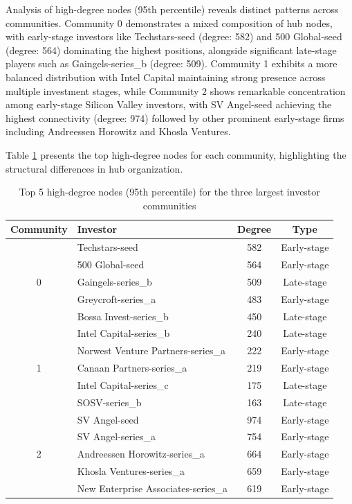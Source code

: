 Analysis of high-degree nodes (95th percentile) reveals distinct patterns across communities. Community 0 demonstrates a mixed composition of hub nodes, with early-stage investors like Techstars-seed (degree: 582) and 500 Global-seed (degree: 564) dominating the highest positions, alongside significant late-stage players such as Gaingels-series\_b (degree: 509). Community 1 exhibits a more balanced distribution with Intel Capital maintaining strong presence across multiple investment stages, while Community 2 shows remarkable concentration among early-stage Silicon Valley investors, with SV Angel-seed achieving the highest connectivity (degree: 974) followed by other prominent early-stage firms including Andreessen Horowitz and Khosla Ventures.

Table \ref{tab:high_degree_nodes} presents the top high-degree nodes for each community, highlighting the structural differences in hub organization.

\begin{table}[ht]
\centering
\begin{tabular}{|c|l|c|c|}
\hline
\textbf{Community} & \textbf{Investor} & \textbf{Degree} & \textbf{Type} \\
\hline
\multirow{5}{*}{0} & Techstars-seed & 582 & Early-stage \\
& 500 Global-seed & 564 & Early-stage \\
& Gaingels-series\_b & 509 & Late-stage \\
& Greycroft-series\_a & 483 & Early-stage \\
& Bossa Invest-series\_b & 450 & Late-stage \\
\hline
\multirow{5}{*}{1} & Intel Capital-series\_b & 240 & Late-stage \\
& Norwest Venture Partners-series\_a & 222 & Early-stage \\
& Canaan Partners-series\_a & 219 & Early-stage \\
& Intel Capital-series\_c & 175 & Late-stage \\
& SOSV-series\_b & 163 & Late-stage \\
\hline
\multirow{5}{*}{2} & SV Angel-seed & 974 & Early-stage \\
& SV Angel-series\_a & 754 & Early-stage \\
& Andreessen Horowitz-series\_a & 664 & Early-stage \\
& Khosla Ventures-series\_a & 659 & Early-stage \\
& New Enterprise Associates-series\_a & 619 & Early-stage \\
\hline
\end{tabular}
\caption{Top 5 high-degree nodes (95th percentile) for the three largest investor communities}
\label{tab:high_degree_nodes}
\end{table}

